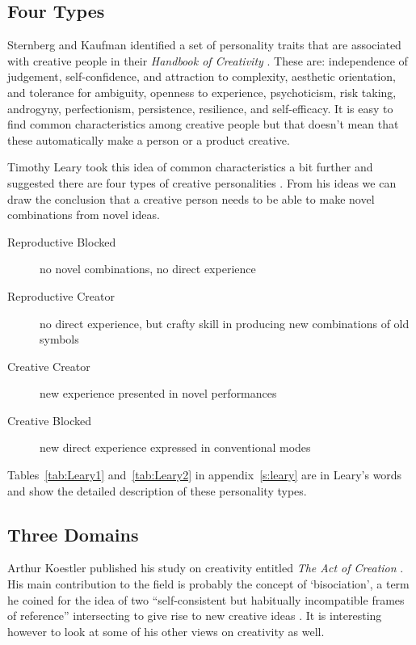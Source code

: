 \subsection{Four Types}
\label{s:personality}

Sternberg and Kaufman identified a set of personality traits that are associated with creative people in their \textit{Handbook of Creativity} \autocite*{Sternberg1999}. These are: independence of judgement, self-confidence, and attraction to complexity, aesthetic orientation, and tolerance for ambiguity, openness to experience, psychoticism, risk taking, androgyny, perfectionism, persistence, resilience, and self-efficacy. It is easy to find common characteristics among creative people but that doesn't mean that these automatically make a person or a product creative.

Timothy Leary took this idea of common characteristics a bit further and suggested there are four types of creative personalities \autocite*{Leary1964}. From his ideas we can draw the conclusion that a creative person needs to be able to make novel combinations from novel ideas.

\begin{description}
  \item [Reproductive Blocked] no novel combinations, no direct experience
  \item [Reproductive Creator] no direct experience, but crafty skill in producing new combinations of old symbols
  \item [Creative Creator] new experience presented in novel performances
  \item [Creative Blocked] new direct experience expressed in conventional modes
\end{description}

Tables~\ref{tab:Leary1} and~\ref{tab:Leary2} in appendix~\ref{s:leary} are in Leary's words and show the detailed description of these personality types.


\subsection{Three Domains}
\label{s:koestler}

Arthur Koestler published his study on creativity entitled \textit{The Act of Creation} \autocite*{Koestler1964}. His main contribution to the field is probably the concept of `bisociation', a term he coined for the idea of two ``self-consistent but habitually incompatible frames of reference'' intersecting to give rise to new creative ideas \autocite*{Koestler1964}. It is interesting however to look at some of his other views on creativity as well.


